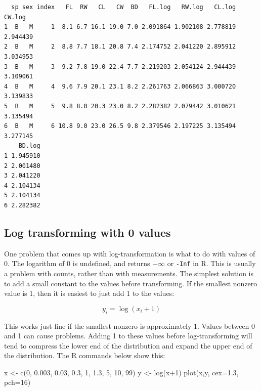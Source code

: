 \documentclass[
  13,
  letterpaper,
]{report}
\newenvironment{Shaded}{\begin{snugshade}}{\end{snugshade}}
\newcommand{\AttributeTok}[1]{\textcolor[rgb]{0.40,0.45,0.13}{#1}}
\newcommand{\DecValTok}[1]{\textcolor[rgb]{0.68,0.00,0.00}{#1}}
\newcommand{\FloatTok}[1]{\textcolor[rgb]{0.68,0.00,0.00}{#1}}
\newcommand{\FunctionTok}[1]{\textcolor[rgb]{0.28,0.35,0.67}{#1}}
\newcommand{\NormalTok}[1]{\textcolor[rgb]{0.00,0.23,0.31}{#1}}
\newcommand{\OtherTok}[1]{\textcolor[rgb]{0.00,0.23,0.31}{#1}}
\newcommand{\SpecialCharTok}[1]{\textcolor[rgb]{0.37,0.37,0.37}{#1}}
\begin{document}
\begin{verbatim}
  sp sex index   FL  RW   CL   CW  BD   FL.log   RW.log   CL.log   CW.log
1  B   M     1  8.1 6.7 16.1 19.0 7.0 2.091864 1.902108 2.778819 2.944439
2  B   M     2  8.8 7.7 18.1 20.8 7.4 2.174752 2.041220 2.895912 3.034953
3  B   M     3  9.2 7.8 19.0 22.4 7.7 2.219203 2.054124 2.944439 3.109061
4  B   M     4  9.6 7.9 20.1 23.1 8.2 2.261763 2.066863 3.000720 3.139833
5  B   M     5  9.8 8.0 20.3 23.0 8.2 2.282382 2.079442 3.010621 3.135494
6  B   M     6 10.8 9.0 23.0 26.5 9.8 2.379546 2.197225 3.135494 3.277145
    BD.log
1 1.945910
2 2.001480
3 2.041220
4 2.104134
5 2.104134
6 2.282382
\end{verbatim}

\subsection{Log transforming with 0 values}\label{sec-trans-common-log0}

One problem that comes up with log-transformation is what to do with
values of 0. The logarithm of 0 is undefined, and returns \(-\infty\) or
\texttt{-Inf} in R. This is usually a problem with counts, rather than
with measurements. The simplest solution is to add a small constant to
the values before transforming. If the smallest nonzero value is 1, then
it is easiest to just add 1 to the values:

\[y_i=\log{\left(x_i+1\right)}\]

This works just fine if the smallest nonzero is approximately 1. Values
between 0 and 1 can cause problems. Adding 1 to these values before
log-transforming will tend to compress the lower end of the distribution
and expand the upper end of the distribution. The R commands below show
this:

\begin{Shaded}
\begin{Highlighting}[]
\NormalTok{x }\OtherTok{\textless{}{-}} \FunctionTok{c}\NormalTok{(}\DecValTok{0}\NormalTok{, }\FloatTok{0.003}\NormalTok{, }\FloatTok{0.03}\NormalTok{, }\FloatTok{0.3}\NormalTok{, }\DecValTok{1}\NormalTok{, }\FloatTok{1.3}\NormalTok{, }\DecValTok{5}\NormalTok{, }\DecValTok{10}\NormalTok{, }\DecValTok{99}\NormalTok{)}
\NormalTok{y }\OtherTok{\textless{}{-}} \FunctionTok{log}\NormalTok{(x}\SpecialCharTok{+}\DecValTok{1}\NormalTok{)}
\FunctionTok{plot}\NormalTok{(x,y, }\AttributeTok{cex=}\FloatTok{1.3}\NormalTok{, }\AttributeTok{pch=}\DecValTok{16}\NormalTok{)}
\end{Highlighting}
\end{Shaded}
\end{document}
